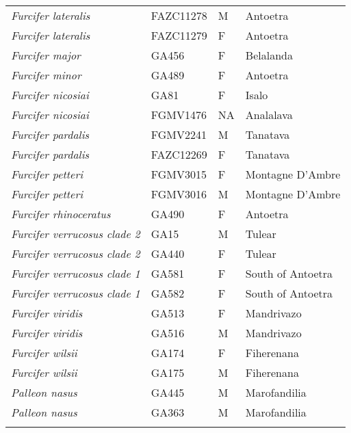 \begin{longtable}{llll}
\textit{Furcifer lateralis} & FAZC11278 & M & Antoetra\\
\textit{Furcifer lateralis} & FAZC11279 & F & Antoetra\\
\textit{Furcifer major} & GA456 & F & Belalanda\\
\textit{Furcifer minor} & GA489 & F & Antoetra\\
\textit{Furcifer nicosiai} & GA81 & F & Isalo\\
\textit{Furcifer nicosiai} & FGMV1476 & NA & Analalava\\
\textit{Furcifer pardalis} & FGMV2241 & M & Tanatava\\
\textit{Furcifer pardalis} & FAZC12269 & F & Tanatava\\
\textit{Furcifer petteri} & FGMV3015 & F & Montagne D'Ambre\\
\textit{Furcifer petteri} & FGMV3016 & M & Montagne D'Ambre\\
\textit{Furcifer rhinoceratus} & GA490 & F & Antoetra\\
\textit{Furcifer verrucosus clade 2} & GA15 & M & Tulear\\
\textit{Furcifer verrucosus clade 2} & GA440 & F & Tulear\\
\textit{Furcifer verrucosus clade 1} & GA581 & F & South of Antoetra\\
\textit{Furcifer verrucosus clade 1} & GA582 & F & South of Antoetra\\
\textit{Furcifer viridis} & GA513 & F & Mandrivazo\\
\textit{Furcifer viridis} & GA516 & M & Mandrivazo\\
\textit{Furcifer wilsii} & GA174 & F & Fiherenana\\
\textit{Furcifer wilsii} & GA175 & M & Fiherenana\\
\hline
\textit{Palleon nasus} & GA445 & M & Marofandilia\\
\textit{Palleon nasus} & GA363 & M & Marofandilia\\
\hline

\label{table-samples}
\end{longtable}
